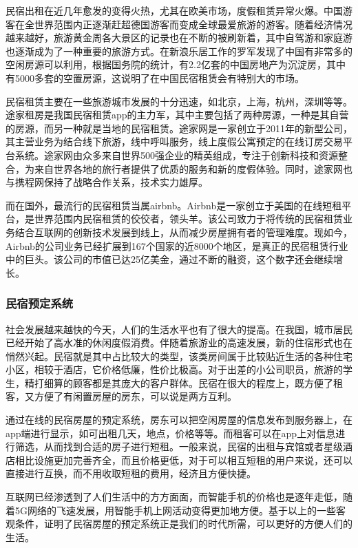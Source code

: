 \documentclass[lang=cn,11pt,a4paper,cite=authoryear]{elegantpaper}
\begin{document}
民宿出租在近几年愈发的变得火热，尤其在欧美市场，度假租赁异常火爆。中国游客在全世界范围内正逐渐赶超德国游客而变成全球最爱旅游的游客。随着经济情况越来越好，旅游黄金周各大景区的记录也在不断的被刷新着，其中自驾游和家庭游也逐渐成为了一种重要的旅游方式。在新浪乐居工作的罗军发现了中国有非常多的空闲房源可以利用，根据国务院的统计，有2.2亿套的中国房地产为沉淀房，其中有5000多套的空置房源，这说明了在中国民宿租赁会有特别大的市场。

民宿租赁主要在一些旅游城市发展的十分迅速，如北京，上海，杭州，深圳等等。途家租房是我国民宿租赁app的主力军，其中主要包括了两种房源，一种是其自营的房源，而另一种就是当地的民宿租赁。途家网是一家创立于2011年的新型公司，其主营业务为结合线下旅游，线中呼叫服务，线上度假公寓预定的在线订房交易平台系统。途家网由众多来自世界500强企业的精英组成，专注于创新科技和资源整合，为来自世界各地的旅行者提供了优质的服务和新的度假体验。同时，途家网也与携程网保持了战略合作关系，技术实力雄厚。

而在国外，最流行的民宿租赁当属airbnb。Airbnb是一家创立于美国的在线短租平台，是世界范围内民宿租赁的佼佼者，领头羊。该公司致力于将传统的民宿租赁业务结合互联网的创新技术发展到线上，从而减少房屋拥有者的管理难度。现如今，Airbnb的公司业务已经扩展到167个国家的近8000个地区，是真正的民宿租赁行业中的巨头。该公司的市值已达25亿美金，通过不断的融资，这个数字还会继续增长。

\subsubsection{民宿预定系统}

社会发展越来越快的今天，人们的生活水平也有了很大的提高。在我国，城市居民已经开始了高水准的休闲度假消费。伴随着旅游业的高速发展，新的住宿形式也在悄然兴起。民宿就是其中占比较大的类型，该类房间属于比较贴近生活的各种住宅小区，相较于酒店，它价格低廉，性价比极高。对于出差的小公司职员，旅游的学生，精打细算的顾客都是其庞大的客户群体。民宿在很大的程度上，既方便了租客，又方便了有闲置房屋的房东，可以说是两方互利。

通过在线的民宿房屋的预定系统，房东可以把空闲房屋的信息发布到服务器上，在app端进行显示，如可出租几天，地点，价格等等。而租客可以在app上对信息进行筛选，从而找到合适的房子进行短租。一般来说，民宿的出租与宾馆或者星级酒店相比设施更加完善齐全，而且价格更低，对于可以相互短租的用户来说，还可以直接进行互换，而不用收取短租的费用，经济且方便快捷。

互联网已经渗透到了人们生活中的方方面面，而智能手机的价格也是逐年走低，随着5G网络的飞速发展，用智能手机上网活动变得更加地方便。基于以上的一些客观条件，证明了民宿房屋的预定系统正是我们的时代所需，可以更好的方便人们的生活。
\end{document}
